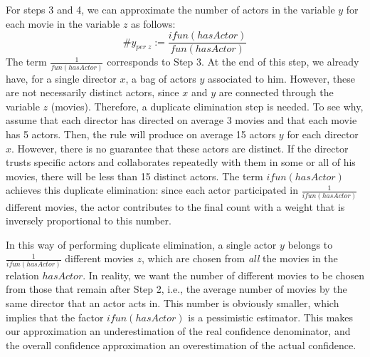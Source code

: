 For steps 3 and 4, we can approximate the number of actors in the variable $y$ for each movie in the variable $z$ as follows:
$$
\#y_{ per \; z} := \frac{ifun(hasActor)}{fun(hasActor)}
$$
The term $\frac{1}{fun(hasActor)}$ corresponds to Step 3. At the end of this step,
we already have, for a single director $x$, a bag of actors $y$ associated to him.
However, these are not necessarily distinct actors, since $x$ and $y$ are connected through the variable $z$ (movies). Therefore, a duplicate elimination step is needed.
To see why, assume that each director has directed on average 3 movies and that each movie has 5 actors. Then, the rule will produce on average 15 actors $y$ for each director $x$.
However, there is no guarantee that these actors are distinct.
If the director trusts specific actors and collaborates repeatedly with them in some or all of his movies, there will be less than 15 distinct actors.
The term $ifun(hasActor)$ achieves this duplicate elimination:
since each actor participated in $\frac{1}{ifun(hasActor)}$ different movies, the actor
contributes to the final count with a weight that is inversely proportional to this number.


In this way of performing duplicate elimination, a single actor $y$ belongs to $\frac{1}{ifun(hasActor)}$ different movies $z$,
which are chosen from \emph{all} the movies in the relation $hasActor$.
In reality, we want the number of different movies to be chosen from those that remain after Step 2, %
i.e., the average number of movies by the same director that an actor acts in. This number is obviously smaller, which
implies that the factor $ifun(hasActor)$ is a pessimistic estimator. This makes
our approximation an underestimation of the real confidence denominator,
and the overall confidence approximation an overestimation of the actual confidence.

